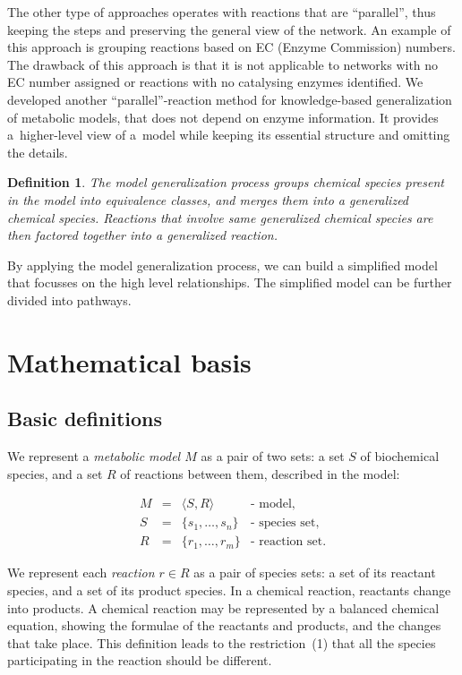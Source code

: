 \documentclass[10pt]{bmc_article}
\newenvironment{bmcformat}{\baselineskip20pt\sloppy\setboolean{publ}{false}}{\baselineskip20pt\sloppy}
\begin{document}
\begin{bmcformat}
The other type of approaches operates with reactions that are ``parallel'', thus keeping the steps and preserving the general view of the network. An example of this approach is grouping reactions based on EC (Enzyme Commission) numbers\cite{Tohsato2000}. The drawback of this approach is that it is not applicable to networks with no EC number assigned or reactions with no catalysing enzymes identified. 
We developed another ``parallel''-reaction method for knowledge-based generalization of metabolic models, that does not depend on enzyme information. It provides a~higher-level view of a~model while keeping its essential structure and omitting the details. 


\newtheorem{eq00}[def]{Definition}
\begin{eq00}
The \emph{model generalization} process groups chemical species present in the model into equivalence classes, and merges them into a generalized chemical species. Reactions that involve same generalized chemical species are then factored together into a generalized reaction. 
\end{eq00}

By applying the model generalization process, we can build a simplified model that focusses on the high level relationships. The simplified model can be further divided into pathways. 




\section*{Mathematical basis}

\subsection*{Basic definitions}

We represent a \emph{metabolic model $M$} as a pair of two sets: a set $S$ of biochemical species, and a set $R$ of reactions between them, described in the model: 

\[ \begin{array}{ccll}
\mbox{$M$} & \mbox{$=$} & \mbox{$\langle S, R \rangle$} & \mbox{- model,} \\
\mbox{$S$} & \mbox{$=$} & \mbox{$\{s_1, \ldots, s_n\}$} &  \mbox{- species set,} \\
\mbox{$R$} & \mbox{$=$} & \mbox{$\{r_1, \ldots, r_m\}$} &  \mbox{- reaction set.} 
\end{array} \]

We represent each \emph{reaction $r \in R$} as a pair of species sets: a set of its reactant species, and a set of its product species. In a chemical reaction, reactants change into products. A chemical reaction may be represented by a balanced chemical equation, showing the formulae of the reactants and products, and the changes that take place\cite{Clugston2000}. This definition leads to the restriction~(1) that all the species participating in the reaction should be different.


\end{bmcformat}
\end{document}
